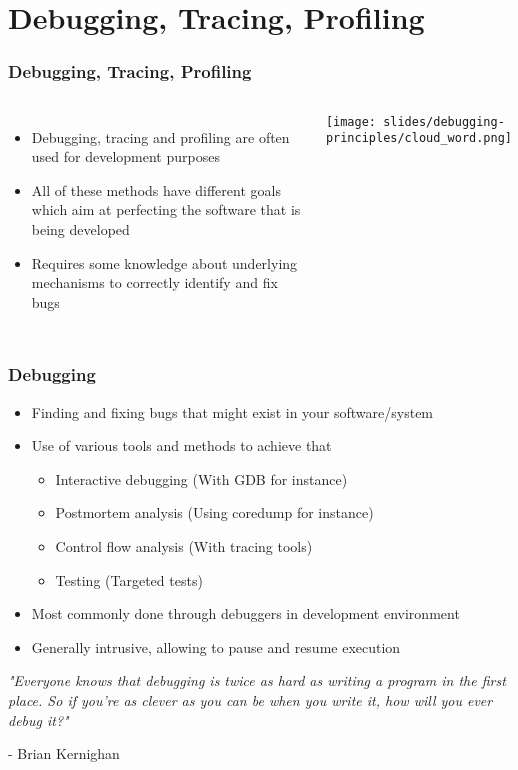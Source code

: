 \section{Debugging, Tracing, Profiling}

\begin{frame}
\frametitle{Debugging, Tracing, Profiling}
  \begin{columns}
    \begin{itemize}
      \item Debugging, tracing and profiling are often used for development purposes
      \item All of these methods have different goals which aim at perfecting the
            software that is being developed
      \item Requires some knowledge about underlying mechanisms to correctly identify
            and fix bugs
    \end{itemize}
    \vspace{0.5cm}
    \texttt{[image: slides/debugging-principles/cloud\_word.png]}
  \end{columns}
\end{frame}

\begin{frame}
  \frametitle{Debugging}
  \begin{itemize}
    \item Finding and fixing bugs that might exist in your software/system
    \item Use of various tools and methods to achieve that
    \begin{itemize}
      \item Interactive debugging (With GDB for instance)
      \item Postmortem analysis (Using coredump for instance)
      \item Control flow analysis (With tracing tools)
      \item Testing (Targeted tests)
    \end{itemize}
    \item Most commonly done through debuggers in development environment
    \item Generally intrusive, allowing to pause and resume execution
  \end{itemize}
  \vspace{0.5cm}

  {\small \em "Everyone knows that debugging is twice as hard as writing a program in the first place. So if you're as
    clever as you can be when you write it, how will you ever debug it?" 

  - Brian Kernighan }

\end{frame}

